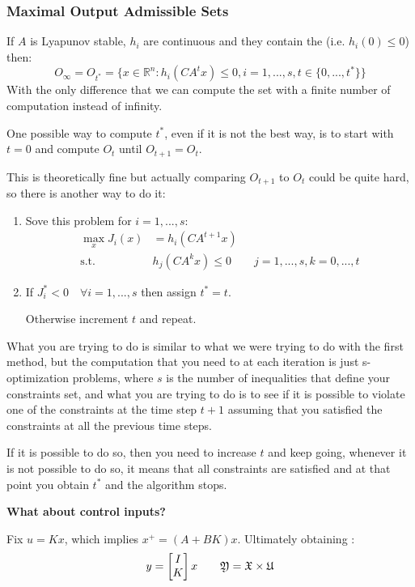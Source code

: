 \subsubsection{Maximal Output Admissible Sets}
\begin{theorem}
If $A$ is Lyapunov stable, $h_i$ are continuous and they contain the  (i.e. $h_i(0)\le0$) then:
\[O_{\infty} = O_{t^*} = \{x\in\mathbb{R}^n: h_i(CA^tx)\le 0, i=1,...,s, t\in\{0, ..., t^*\}\}\]
With the only difference that we can compute the set with a finite number of computation instead of infinity.
\end{theorem}
One possible way to compute $t^*$, even if it is not the best way, is to start with $t=0$ and compute $O_t$ until $O_{t+1}=O_t$.

This is theoretically fine but actually comparing $O_{t+1}$ to $O_t$ could be quite hard, so there is another way to do it:
\begin{enumerate}
\item Sove this problem for $i=1,...,s$:
\begin{align*}
\max_x J_i(x) &= h_i(CA^{t+1}x)\\
\text{s.t. } & h_j(CA^kx)\le 0\qquad j=1,...,s , k=0,...,t
\end{align*}
\item If $J_i^* < 0 \quad \forall i = 1,...,s$ then assign $t^* = t$.

Otherwise increment $t$ and repeat.
\end{enumerate}
What you are trying to do is similar to what we were trying to do with the first method, but the computation that you need to at each iteration is just s-optimization problems, where $s$ is the number of inequalities that define your constraints set, and what you are trying to do is to see if it is possible to violate one of the constraints at the time step  $t+1$ assuming that you satisfied the constraints at all the previous time steps.

If it is possible to do so, then you need to increase $t$ and keep going, whenever it is not possible to do so, it means that all constraints are satisfied and at that point you obtain $t^*$ and the algorithm stops.

\begin{center}
\textbf{What about control inputs?}
\end{center}


Fix $u= Kx$, which implies $x^+ = (A+BK)x$. Ultimately obtaining :
\[y = \begin{bmatrix}I\\K\end{bmatrix}x\qquad\mathfrak{Y} = \mathfrak{X}\times\mathfrak{U}\]

